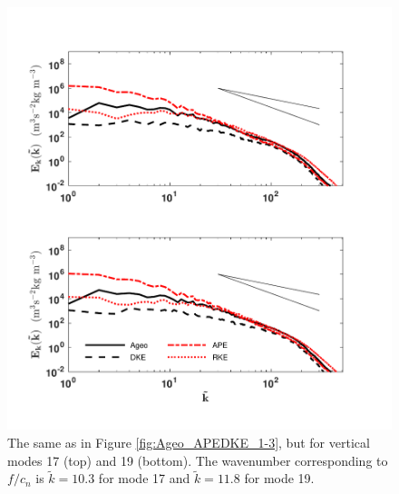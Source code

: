 \begin{figure}[H]
\includegraphics[scale=1]{Chapter4/img/Ageo_APEDKE_17-19}
\caption{The same as in Figure \ref{fig:Ageo_APEDKE_1-3}, but for vertical modes 17 (top) and 19 (bottom). The wavenumber corresponding to $f/c_n$ is $\tilde{k} = 10.3$ for mode 17 and $\tilde{k} = 11.8$ for mode 19.}
\label{fig:Ageo_APEDKE_17-19}
\end{figure}

